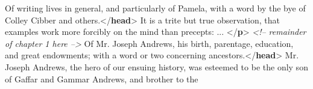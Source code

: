 \begin{shaded}
\hspace*{1em}Of writing lives in general, and particularly of Pamela, with a word\mbox{}\newline 
\hspace*{1em}\hspace*{1em}\hspace*{1em}\hspace*{1em} by the bye of Colley Cibber and others.{</\textbf{head}>}\mbox{}\newline 
\hspace*{1em}It is a trite but true observation, that examples work more forcibly on\mbox{}\newline 
\hspace*{1em}\hspace*{1em}\hspace*{1em}\hspace*{1em} the mind than precepts: ... {</\textbf{p}>}\mbox{}\newline 
\textit{<!-- remainder of chapter 1 here -->}\mbox{}\newline 
{}\mbox{}\newline 
{}\mbox{}\newline 
\hspace*{1em}Of Mr. Joseph Andrews, his birth, parentage, education, and great\mbox{}\newline 
\hspace*{1em}\hspace*{1em}\hspace*{1em}\hspace*{1em} endowments; with a word or two concerning ancestors.{</\textbf{head}>}\mbox{}\newline 
\hspace*{1em}Mr. Joseph Andrews, the hero of our ensuing history, was esteemed to\mbox{}\newline 
\hspace*{1em}\hspace*{1em}\hspace*{1em}\hspace*{1em} be the only son of Gaffar and Gammar Andrews, and brother to the\mbox{}\newline 

\end{shaded}

